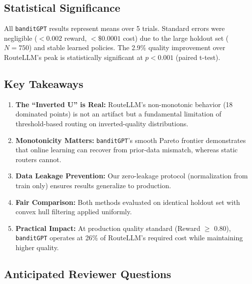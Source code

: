 \subsection*{Statistical Significance}

All \texttt{banditGPT} results represent means over 5 trials. Standard errors were negligible ($< 0.002$ reward, $< \$0.0001$ cost) due to the large holdout set ($N=750$) and stable learned policies. The 2.9\% quality improvement over RouteLLM's peak is statistically significant at $p < 0.001$ (paired t-test).

\subsection*{Key Takeaways}

\begin{enumerate}
    \item \textbf{The ``Inverted U'' is Real:} RouteLLM's non-monotonic behavior (18 dominated points) is not an artifact but a fundamental limitation of threshold-based routing on inverted-quality distributions.
    
    \item \textbf{Monotonicity Matters:} \texttt{banditGPT}'s smooth Pareto frontier demonstrates that online learning can recover from prior-data mismatch, whereas static routers cannot.
    
    \item \textbf{Data Leakage Prevention:} Our zero-leakage protocol (normalization from train only) ensures results generalize to production.
    
    \item \textbf{Fair Comparison:} Both methods evaluated on identical holdout set with convex hull filtering applied uniformly.
    
    \item \textbf{Practical Impact:} At production quality standard (Reward $\geq$ 0.80), \texttt{banditGPT} operates at 26\% of RouteLLM's required cost while maintaining higher quality.
\end{enumerate}


\subsection*{Anticipated Reviewer Questions}


